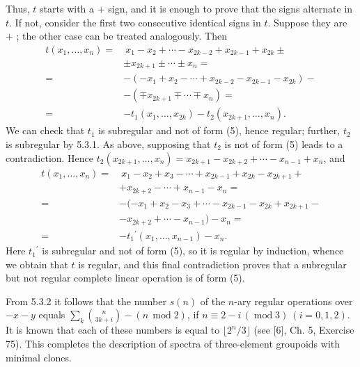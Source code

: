 \documentclass[a4paper,reqno]{amsart}\usepackage{amssymb,latexsym}
\theoremstyle{definition}
\theoremstyle{remark}
\numberwithin{equation}{section}
\numberwithin{theorem}{section}
\begin{document}
Thus, $t$ starts with a $+$ sign, and it is enough to prove that the signs
alternate in $t$. If not, consider the first two consecutive identical signs
in $t$. Suppose they are $+$ ; the other case can be treated analogously. Then\begin{align*}
t(x_{1},\ldots,x_{n})=  &  \ x_{1}-x_{2}+\cdots-x_{2k-2}+x_{2k-1}+x_{2k}\pm\\
&  \pm x_{2k+1}\pm\cdots\pm x_{n}=\\
=  &  -(-x_{1}+x_{2}-\cdots+x_{2k-2}-x_{2k-1}-x_{2k})-\\
&  -(\mp x_{2k+1}\mp\cdots\mp x_{n})=\\
=  &  -t_{1}(x_{1},\ldots,x_{2k})-t_{2}(x_{2k+1},\ldots,x_{n}).
\end{align*}
We can check that $t_{1}$ is subregular and not of form (5), hence regular;
further, $t_{2}$ is subregular by 5.3.1. As above, supposing that $t_{2}$ is
not of form (5) leads to a contradiction. Hence $t_{2}(x_{2k+1},\ldots
,x_{n})=x_{2k+1}-x_{2k+2}+\cdots-x_{n-1}+x_{n}$, and
\begin{align*}
t(x_{1},\ldots,x_{n})=  &  \ x_{1}-x_{2}+x_{3}-\cdots+x_{2k-1}+x_{2k}-x_{2k+1}+\\
&  +x_{2k+2}-\cdots+x_{n-1}-x_{n}=\\
=  &  -(-x_{1}+x_{2}-x_{3}+\cdots-x_{2k-1}-x_{2k}+x_{2k+1}-\\
&  -x_{2k+2}+\cdots-x_{n-1})-x_{n}=\\
=  &  -{t_{1}}^{\prime}(x_{1},\ldots,x_{n-1})-x_{n}.
\end{align*}
Here ${t_{1}}^{\prime}$ is subregular and not of form (5), so it is regular by
induction, whence we obtain that $t$ is regular, and this final contradiction
proves that a subregular but not regular complete linear operation is of form (5).

From 5.3.2 it follows that the number $s(n)$ of the $n$-ary regular operations
over $-x-y$ equals $\sum_{k}{\binom{n}{{3k+i}}}-(n\,\operatorname{mod}2)$, if
$n\equiv2-i\,(\operatorname{mod}3)~(i=0,1,2)$. It is known that each of these
numbers is equal to $\lfloor{2}^{n}/3\rfloor$ (see [6], Ch. 5, Exercise 75).
This completes the description of spectra of three-element groupoids with
minimal clones.

\smallskip
\end{document}
